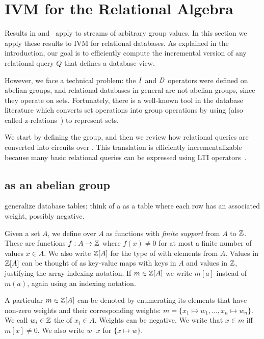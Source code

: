 \section{IVM for the Relational Algebra}\label{sec:relational}

Results in  and~
apply to streams of arbitrary group values.  In this
section we apply these results to
IVM for relational databases.  As explained in the introduction, our goal is to
efficiently compute the incremental version of any relational query $Q$
that defines a database view.

However, we face a technical problem: the $\mathit{I}$ and $\mathit{D}$ operators were
defined on abelian groups, and relational databases in general are
not abelian groups, since they operate on sets.  Fortunately,
there is a well-known tool in the database literature
which converts set operations into group operations by using \zrs
(also called z-relations~\cite{green-tcs11}) to represent sets.

We start by defining the \zrs group, and then we review how
relational queries are converted into \dbsp circuits  over \zrs.
This translation is efficiently incrementalizable because
many basic relational queries can be expressed using LTI \zr operators~.

\subsection{\zrs as an abelian group}

\zrs generalize database tables: think of a \zr as a table where each
row has an associated weight, possibly negative.

Given a set $A$, we define  over $A$ as functions with
\emph{finite support} from $A$ to $\mathbb{Z}$.  These are functions $f: A
\rightarrow \mathbb{Z}$ where $f(x) \not= 0$ for at most a finite number of
values $x \in A$.  We also write $\mathbb{Z}[A]$ for the type of \zrs with
elements from $A$.  Values in $\mathbb{Z}[A]$ can be thought of as key-value
maps with keys in $A$ and values in $\mathbb{Z}$, justifying the array
indexing notation.  If $m \in \mathbb{Z}[A]$ we write $m[a]$ instead of
$m(a)$, again using an indexing notation.

A particular \zr $m \in \mathbb{Z}[A]$ can be denoted by enumerating its
elements that have non-zero weights and their corresponding weights:
$m = \{ x_1 \mapsto w_1, \dots, x_n \mapsto w_n \}$.
We call $w_i \in \mathbb{Z}$ the 
of $x_i \in A$.  Weights can be negative.
We write that $x \in m$ iff $m[x] \not= 0$.
We also write $w \cdot x$ for $\{ x \mapsto w \}$.

